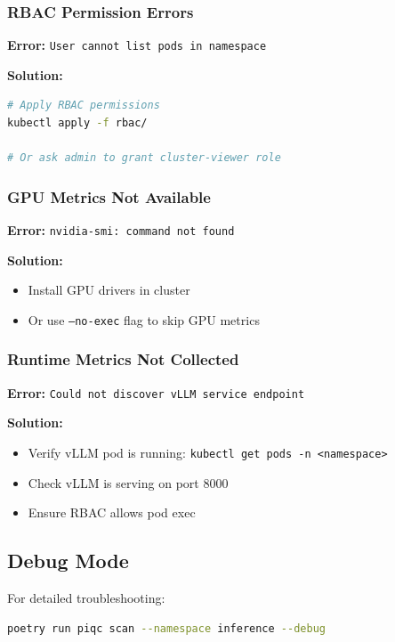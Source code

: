 \documentclass[11pt,a4paper]{article}
\begin{document}
\subsubsection{RBAC Permission Errors}

\textbf{Error:} \texttt{User cannot list pods in namespace}

\textbf{Solution:}
\begin{lstlisting}[language=bash]
# Apply RBAC permissions
kubectl apply -f rbac/

# Or ask admin to grant cluster-viewer role
\end{lstlisting}

\subsubsection{GPU Metrics Not Available}

\textbf{Error:} \texttt{nvidia-smi: command not found}

\textbf{Solution:}
\begin{itemize}
    \item Install GPU drivers in cluster
    \item Or use \texttt{--no-exec} flag to skip GPU metrics
\end{itemize}

\subsubsection{Runtime Metrics Not Collected}

\textbf{Error:} \texttt{Could not discover vLLM service endpoint}

\textbf{Solution:}
\begin{itemize}
    \item Verify vLLM pod is running: \texttt{kubectl get pods -n <namespace>}
    \item Check vLLM is serving on port 8000
    \item Ensure RBAC allows pod exec
\end{itemize}

\subsection{Debug Mode}

For detailed troubleshooting:

\begin{lstlisting}[language=bash]
poetry run piqc scan --namespace inference --debug
\end{lstlisting}
\end{document}
